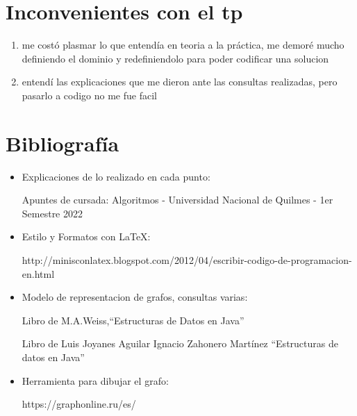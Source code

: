 \documentclass[a4paper,11pt]{article}
\begin{document}
\section{Inconvenientes con el tp}
\begin{enumerate}
  \item me costó plasmar lo que entendía en teoria a la práctica, me demoré mucho definiendo el dominio y redefiniendolo para poder codificar una solucion
  \item entendí las explicaciones que me dieron ante las consultas realizadas, pero pasarlo a codigo no me fue facil
\end{enumerate}
\section{Bibliografía}
\begin{itemize}
  \item Explicaciones de lo realizado en cada punto:
  
  Apuntes de cursada: Algoritmos - Universidad Nacional de Quilmes - 1er Semestre 2022
  \item Estilo y Formatos con LaTeX:
  
   http://minisconlatex.blogspot.com/2012/04/escribir-codigo-de-programacion-en.html
   \item Modelo de representacion de grafos, consultas varias:
   
   Libro de M.A.Weiss,“Estructuras de Datos en Java” 
   
   Libro de Luis Joyanes Aguilar
Ignacio Zahonero Martínez  “Estructuras de datos en Java”  
   
   \item Herramienta para dibujar el grafo:
   
   https://graphonline.ru/es/
\end{itemize}
\end{document}
